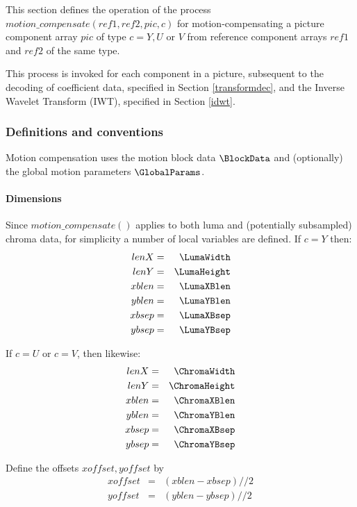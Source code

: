 \label{motioncompensate}

This section defines the operation of the process
$motion\_compensate(ref1, ref2,  pic, c)$ for motion-compensating a
picture component array  $pic$ of type $c=Y, U$ or $V$ from reference 
component arrays $ref1$ and $ref2$ of the same type.

This process is invoked for each component in a picture, subsequent to the 
decoding of coefficient data, specified in Section \ref{transformdec}, and the Inverse Wavelet 
Transform (IWT), specified in Section \ref{idwt}. 

\subsubsection{Definitions and conventions}

Motion compensation uses the motion block data $\BlockData$ and (optionally) the
global motion parameters $\GlobalParams$.

\paragraph{Dimensions}

Since $motion\_compensate()$ applies to both luma and (potentially subsampled)
chroma data, for simplicity a number of local variables are defined. If $c=Y$ then:
\begin{eqnarray*}
lenX & = & \LumaWidth \\
lenY & = & \LumaHeight \\
xblen & = & \LumaXBlen \\
yblen & = & \LumaYBlen \\
xbsep & = & \LumaXBsep \\
ybsep & = & \LumaYBsep
\end{eqnarray*}

If $c=U$ or $c=V$, then likewise:
\begin{eqnarray*}
lenX & = & \ChromaWidth \\
lenY & = & \ChromaHeight \\
xblen & = & \ChromaXBlen \\
yblen & = & \ChromaYBlen \\
xbsep & = & \ChromaXBsep \\
ybsep & = & \ChromaYBsep
\end{eqnarray*}

Define the offsets $xoffset, yoffset$ by
\begin{eqnarray*}
xoffset & = & (xblen-xbsep)//2 \\
yoffset & = & (yblen-ybsep)//2
\end{eqnarray*}

